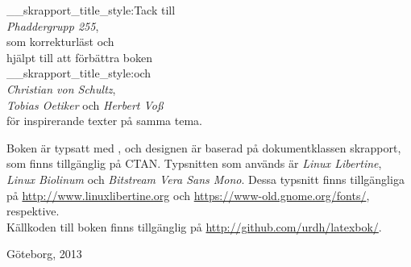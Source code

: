 \documentclass[lang=sv,ptsize=10pt,font=none,nomath,titles=bf,../../a4.tex]{subfiles}
\begin{document}
\pagestyle{empty}

\begin{titlepage} %
	\maketitle[hide={date,email}]
	\begin{abstract}
		En inkomplett guide till att skriva och typsätta \LaTeX-dokument riktad
		till studenter på Chalmers Tekniska Högskola, specifikt programmen
		Teknisk Matematik och Teknisk Fysik.
		Inspiration har tagits från bland annat
		\textcites{Schultz05}{Voss10},
		men främst från \textcite{Oetiker11}.
	\end{abstract}
\end{titlepage} %
\cleardoublepage

\begin{center} %
	\large\vspace*{36pt}

	{\csname__skrapport_title_style:\endcsname\Large Tack till}\\[1ex]
	\emph{Phaddergrupp 255},\\
	som korrekturläst och\\
	hjälpt till att förbättra boken\\[1ex]
	{\csname__skrapport_title_style:\endcsname\Large och}\\[1ex]
	\emph{Christian von Schultz},\\
	\emph{Tobias Oetiker} och \emph{Herbert Voß}\\
	för inspirerande texter på samma tema.
	\vfill 
	
	\small
	\begin{minipage}{\textwidth}
	\footnotesize
	Boken är typsatt med , och designen är baserad på 
	dokumentklassen \textsf{skrapport}, som finns tillgänglig på
	CTAN. Typsnitten som används är \emph{Linux Libertine}, \emph{Linux Biolinum} och \emph{Bitstream Vera Sans Mono}.
	Dessa typsnitt finns tillgängliga på
	\url{http://www.linuxlibertine.org} och
	\url{https://www-old.gnome.org/fonts/},
	respektive. \\[1ex]
	Källkoden till boken finns tillgänglig på
	\url{http://github.com/urdh/latexbok/}.
	\end{minipage}

	\medskip
	Göteborg, 2013
\end{center}
\end{document}
